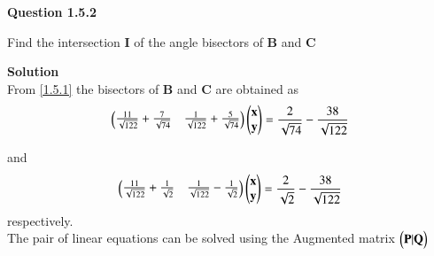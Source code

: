 \documentclass[journal,12pt,twocolumn]{IEEEtran}
\begin{document}
\let\vec\mathbf




\vspace{3cm}

\textbf{Question 1.5.2}
\begin{flushleft}
Find the intersection $\vec{I}$ of the angle bisectors of $\vec{B}$ and $\vec{C}$
\end{flushleft}

\begin{flushleft}
\textbf{Solution}\\
From \ref{1.5.1} the bisectors of $\vec{B}$ and $\vec{C}$ are obtained as 
\begin{align}
\myvec{
\frac{11}{\sqrt{122}}+\frac{7}{\sqrt{74}} & \frac{1}{\sqrt{122}}+\frac{5}{\sqrt{74}}\\
}
\myvec{
\vec{x}\\
\vec{y}\\
}
=\frac{2}{\sqrt{74}}-\frac{38}{\sqrt{122}}
\end{align}

and 
\begin{align}
\myvec{
\frac{11}{\sqrt{122}}+\frac{1}{\sqrt{2}} & \frac{1}{\sqrt{122}}-\frac{1}{\sqrt{2}}\\
}
\myvec{
\vec{x}\\
\vec{y}\\
}
=\frac{2}{\sqrt{2}}-\frac{38}{\sqrt{122}}
\end{align}
respectively.\\
The pair of linear equations can be solved using the Augmented matrix $\myvec{
\vec{P}|\vec{Q}}$


\end{flushleft}
\end{document}
